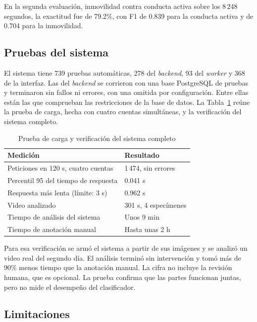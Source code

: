 \documentclass[conference,letterpaper]{IEEEtran}
\begin{document}
En la segunda evaluación, inmovilidad contra conducta activa sobre los 8\,248 segundos, la
exactitud fue de 79.2\%, con F1 de 0.839 para la conducta activa y de 0.704 para la
inmovilidad.

\subsection{Pruebas del sistema}

El sistema tiene 739 pruebas automáticas, 278 del \textit{backend}, 93 del \textit{worker} y
368 de la interfaz. Las del \textit{backend} se corrieron con una base PostgreSQL de pruebas
y terminaron sin fallos ni errores, con una omitida por configuración. Entre ellas están las
que comprueban las restricciones de la base de datos. La Tabla~\ref{tab:sistema} reúne la
prueba de carga, hecha con cuatro cuentas simultáneas, y la verificación del sistema
completo.

\begin{table}[t]
\renewcommand{\arraystretch}{1.15}
\caption{Prueba de carga y verificación del sistema completo}
\label{tab:sistema}
\centering
\footnotesize
\begin{tabular}{|l|l|}
\hline
\textbf{Medición} & \textbf{Resultado} \\
\hline
Peticiones en 120 s, cuatro cuentas & 1\,474, sin errores \\
\hline
Percentil 95 del tiempo de respuesta & 0.041 s \\
\hline
Respuesta más lenta (límite: 3 s) & 0.962 s \\
\hline
Video analizado & 301 s, 4 especímenes \\
\hline
Tiempo de análisis del sistema & Unos 9 min \\
\hline
Tiempo de anotación manual & Hasta unas 2 h \\
\hline
\end{tabular}
\end{table}

Para esa verificación se armó el sistema a partir de sus imágenes y se analizó un video real
del segundo día. El análisis terminó sin intervención y tomó más de 90\% menos tiempo que la
anotación manual. La cifra no incluye la revisión humana, que es opcional. La prueba
confirma que las partes funcionan juntas, pero no mide el desempeño del clasificador.

\subsection{Limitaciones}
\end{document}
